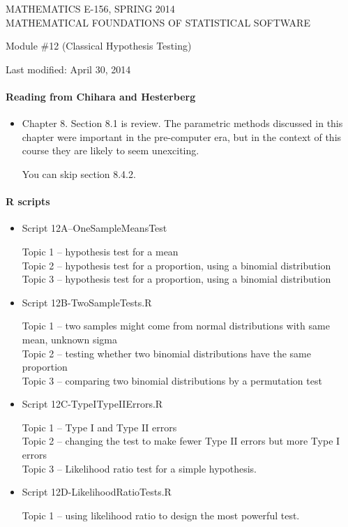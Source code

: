 \documentclass[12pt]{article}
\begin{document}
\begin{center}
MATHEMATICS E-156, SPRING 2014 \\
MATHEMATICAL FOUNDATIONS OF STATISTICAL SOFTWARE

\smallskip

Module \#12 (Classical Hypothesis Testing)
\end{center}

Last modified: April 30, 2014

\medskip

\paragraph*{Reading from Chihara and Hesterberg}

\begin{itemize}
\item Chapter 8. Section 8.1 is review. The parametric methods discussed in this chapter were important in the pre-computer era, but in the context of this course they are likely to seem unexciting. 

You can skip section 8.4.2.
\end{itemize}

\pagebreak


\paragraph*{R scripts}
\begin{itemize}
\item Script 12A--OneSampleMeansTest

Topic 1 -- hypothesis test for a mean\\
Topic 2 -- hypothesis test for a proportion, using a binomial distribution\\
Topic 3 -- hypothesis test for a proportion, using a binomial distribution

\item Script 12B-TwoSampleTests.R

Topic 1 -- two samples might come from normal distributions with same mean, unknown sigma\\
Topic 2 -- testing whether two binomial distributions have the same proportion\\
Topic 3 -- comparing two binomial distributions by a permutation test

\item Script 12C-TypeITypeIIErrors.R

Topic 1 -- Type I and Type II errors\\
Topic 2 -- changing the test to make fewer Type II errors but more Type I errors\\
Topic 3 -- Likelihood ratio test for a simple hypothesis.

\item Script 12D-LikelihoodRatioTests.R

Topic 1 -- using likelihood ratio to design the most powerful test.\\

\end{itemize}
\end{document}
